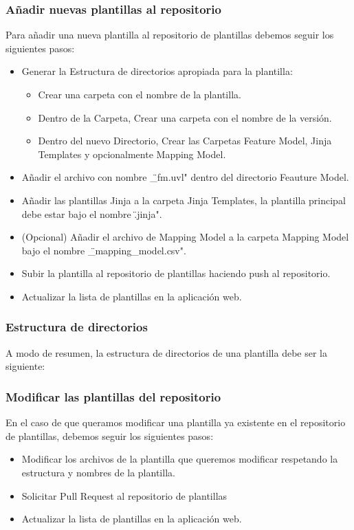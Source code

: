 \documentclass[12pt, a4paper, twoside]{article}
\begin{document}
\begin{umaappendices}
	\subsubsection{Añadir nuevas plantillas al repositorio}
	Para añadir una nueva plantilla al repositorio de plantillas debemos seguir los siguientes pasos:
	\begin{itemize}
		\item Generar la Estructura de directorios apropiada para la plantilla:
		\begin{itemize}
			\item Crear una carpeta con el nombre de la plantilla.
			\item Dentro de la Carpeta, Crear una carpeta con el nombre de la versión.
			\item Dentro del nuevo Directorio, Crear las Carpetas Feature Model, Jinja Templates y opcionalmente Mapping Model.
		\end{itemize}
		\item Añadir el archivo con nombre \"<Nombre de la Plantilla>\_fm.uvl" dentro del directorio Feauture Model.
		\item Añadir las plantillas Jinja a la carpeta Jinja Templates, la plantilla principal debe estar bajo el nombre \"<Nombre de la Plantilla>.jinja".
		\item (Opcional) Añadir el archivo de Mapping Model  a la carpeta Mapping Model bajo el nombre \"<Nombre de la Plantilla>\_mapping\_model.csv".
		\item Subir la plantilla al repositorio de plantillas haciendo push al repositorio.
		\item Actualizar la lista de plantillas en la aplicación web.
	\end{itemize}
	\subsubsection{Estructura de directorios}
	 A modo de resumen, la estructura de directorios de una plantilla debe ser la siguiente:



	\subsubsection{Modificar las plantillas del repositorio}
	En el caso de que queramos modificar una plantilla ya existente en el repositorio de plantillas, debemos seguir los siguientes pasos:
	\begin{itemize}
		\item Modificar los archivos de la plantilla que queremos modificar respetando la estructura y nombres de la plantilla.
		\item Solicitar Pull Request al repositorio de plantillas
		\item Actualizar la lista de plantillas en la aplicación web.
	\end{itemize}


\end{umaappendices}
\end{document}
